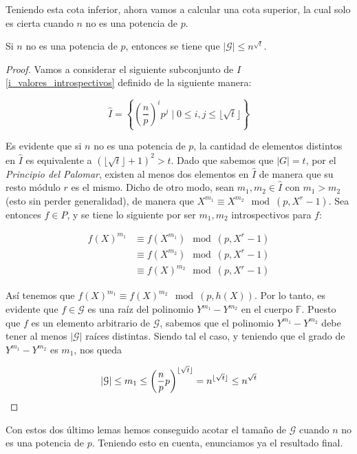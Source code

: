 Teniendo esta cota inferior, ahora vamos a calcular una cota superior, la cual solo es cierta cuando $n$ no es una potencia de $p$.

\begin{lema}\label{cota_superior_G}
	Si $n$ no es una potencia de $p$, entonces se tiene que $|\mathcal{G}| \leq n^{\sqrt{t}}$.
\end{lema}

\begin{proof}
	Vamos a considerar el siguiente subconjunto de $I$ \eqref{i_valores_introspectivos} definido de la siguiente manera:
	
	\begin{equation}\label{subconjunto_de_I}
	\hat{I} = \left\{\left(\frac{n}{p}\right)^ip^j \mid 0 \leq i,j \leq \lfloor \sqrt{t} \rfloor \right\}
	\end{equation}
	
	Es evidente que si $n$ no es una potencia de $p$, la cantidad de elementos distintos en $\hat{I}$ es equivalente a $(\lfloor \sqrt{t} \rfloor + 1)^2 > t$. Dado que sabemos que $|G| = t$, por el \textit{Principio del Palomar}, existen al menos dos elementos en $\hat{I}$ de manera que su resto módulo $r$ es el mismo. Dicho de otro modo, sean $m_1, m_2 \in \hat{I}$ con $m_1 > m_2$ (esto sin perder generalidad), de manera que $X^{m_1} \equiv X^{m_2} \mod(p, X^r - 1)$. Sea entonces $f \in P$, y se tiene lo siguiente por ser $m_1, m_2$ introspectivos para $f$:
	
	\begin{align}
	f(X)^{m_1} &\equiv f(X^{m_1}) \mod(p, X^r-1)\\
	&\equiv f(X^{m_2}) \mod(p, X^r-1)\\
	&\equiv f(X)^{m_2} \mod(p, X^r-1)
	\end{align}
	
	Así tenemos que $f(X)^{m_1} \equiv f(X)^{m_2} \mod(p, h(X))$. Por lo tanto, es evidente que $f \in \mathcal{G}$ es una raíz del polinomio $Y^{m_1} - Y^{m_2}$ en el cuerpo $\mathbb{F}$. Puesto que $f$ es un elemento arbitrario de $\mathcal{G}$, sabemos que el polinomio $Y^{m_1} - Y^{m_2}$ debe tener al menos $|\mathcal{G}|$ raíces distintas. Siendo tal el caso, y teniendo que el grado de $Y^{m_1} - Y^{m_2}$ es $m_1$, nos queda
	
	\[|\mathcal{G}| \leq m_1 \leq \left(\frac{n}{p}p\right)^{\lfloor\sqrt{t}\rfloor} = n^{\lfloor\sqrt{t}\rfloor} \leq n^{\sqrt{t}}\qedhere \]
\end{proof}

Con estos dos último lemas hemos conseguido acotar el tamaño de $\mathcal{G}$ cuando $n$ no es una potencia de $p$. Teniendo esto en cuenta, enunciamos ya el resultado final.

